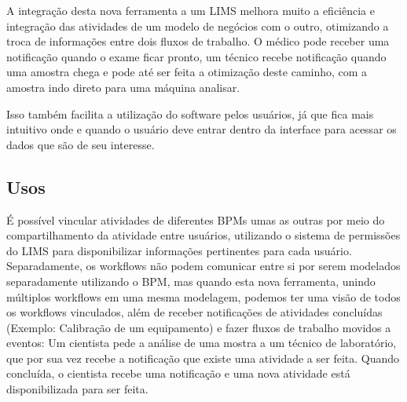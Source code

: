 A integração desta nova ferramenta a um LIMS melhora muito a eficiência e integração das atividades de um modelo de negócios com o outro, otimizando a troca de informações entre dois fluxos de trabalho. O médico pode receber uma notificação quando o exame ficar pronto, um técnico recebe notificação quando uma amostra chega e pode até ser feita a otimização deste caminho, com a amostra indo direto para uma máquina analisar.

Isso também facilita a utilização do software pelos usuários, já que fica mais intuitivo onde e quando o usuário deve entrar dentro da interface para acessar os dados que são de seu interesse.


\subsection{Usos}

É possível vincular atividades de diferentes BPMs umas as outras por meio do compartilhamento da atividade entre usuários, utilizando o sistema de permissões do LIMS para disponibilizar informações pertinentes para cada usuário. Separadamente, os workflows não podem comunicar entre si por serem modelados separadamente utilizando o BPM, mas quando esta nova ferramenta, unindo múltiplos workflows em uma mesma modelagem, podemos ter uma visão de todos os workflows vinculados, além de receber notificações de atividades concluídas (Exemplo: Calibração de um equipamento) e fazer fluxos de trabalho movidos a eventos: Um cientista pede a análise de uma mostra a um técnico de laboratório, que por sua vez recebe a notificação que existe uma atividade a ser feita. Quando concluída, o cientista recebe uma notificação e uma nova atividade está disponibilizada para ser feita.